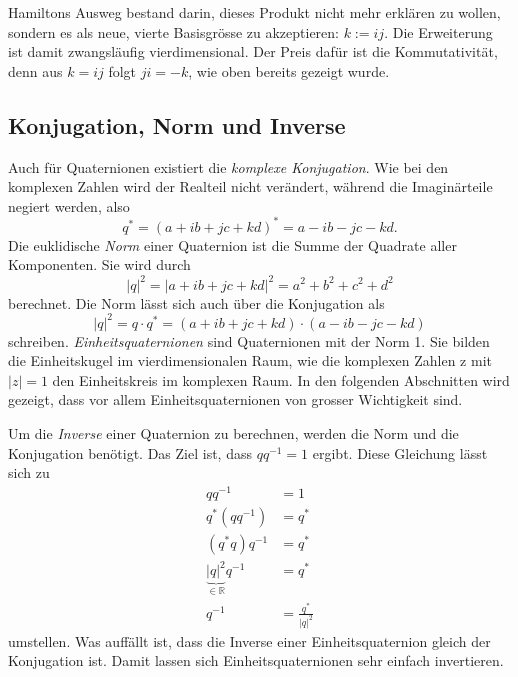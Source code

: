Hamiltons Ausweg bestand darin, dieses Produkt nicht mehr erklären zu
wollen, sondern es als neue, vierte Basisgrösse zu akzeptieren:
$k := i\!j$. Die Erweiterung ist damit zwangsläufig vierdimensional. Der
Preis dafür ist die Kommutativität, denn aus $k = i\!j$ folgt $ji = -k$,
wie oben bereits gezeigt wurde.

\subsection{Konjugation, Norm und Inverse}

Auch für Quaternionen existiert die \emph{komplexe Konjugation}. Wie bei 
%
den komplexen Zahlen wird der Realteil nicht verändert, während die
Imaginärteile negiert werden, also
\begin{equation*}
    q^* = (a + ib + jc + kd)^* = a - ib - jc - kd .
\end{equation*}
Die euklidische \emph{Norm} einer Quaternion ist die Summe der Quadrate aller 
Komponenten. Sie wird durch
\begin{equation*}
    |q|^2 = |a + ib + jc + kd|^2 = a^2 + b^2 + c^2 + d^2
\end{equation*}
berechnet.
Die Norm lässt sich auch über die Konjugation als
%
\begin{equation*}
    |q|^2 = q \cdot q^* 
    = (a + ib + jc + kd) \cdot (a - ib - jc - kd)
\end{equation*}
schreiben.
\emph{Einheitsquaternionen} sind Quaternionen mit der Norm 1. Sie 
%
bilden die Einheitskugel im vierdimensionalen Raum, wie die komplexen 
Zahlen z mit $|z| = 1$ den 
%
Einheitskreis im komplexen Raum. In den folgenden Abschnitten wird 
gezeigt, dass vor allem Einheitsquaternionen von grosser 
Wichtigkeit sind.

Um die \emph{Inverse} einer Quaternion zu berechnen, werden die Norm und 
die Konjugation benötigt. Das Ziel ist, dass $q q^{-1} = 1$ 
%
ergibt. Diese Gleichung lässt sich zu
\begin{align*}
    q q^{-1} &= 1 \\
    q^* (qq^{-1}) &= q^* \\
    (q^* q) q^{-1} &= q^* \\
    \underbrace{|q|^2}_{\in \mathbb{R}} q^{-1} &= q^* \\
    q^{-1} &= \frac{q^*}{|q|^2}
\end{align*}
umstellen.
Was auffällt ist, dass die Inverse einer Einheitsquaternion gleich 
der Konjugation ist. Damit lassen sich Einheitsquaternionen sehr 
einfach invertieren.
